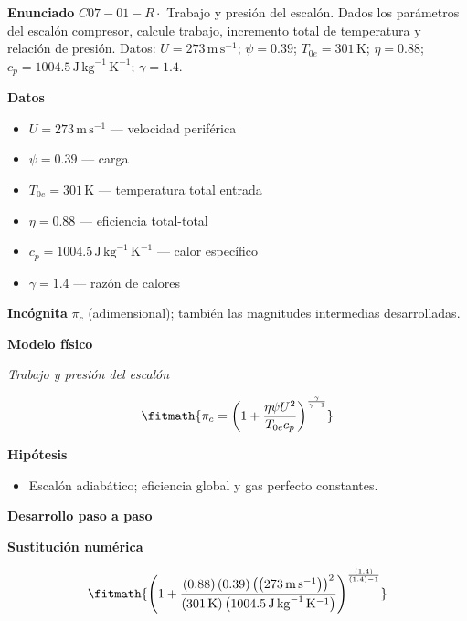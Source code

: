 \documentclass[10pt,openany]{book}
\begin{document}
\begin{tcolorbox}[title={Problema resuelto 1}, studiumworked, breakable]

\noindent\textbf{Enunciado}
\(C07-01-R \cdot\) Trabajo y presión del escalón. Dados los parámetros del escalón compresor, calcule trabajo, incremento total de temperatura y relación de presión. Datos: \(U=273\, \mathrm{m}\,\mathrm{s}^{-1}\); \(\psi=0.39\); \(T_{0e}=301\, \mathrm{K}\); \(\eta=0.88\); \(c_p=1004.5\, \mathrm{J}\,\mathrm{kg}^{-1}\,\mathrm{K}^{-1}\); \(\gamma=1.4\).

\noindent\textbf{Datos}
\begin{itemize}
\item $U = 273\,\mathrm{m}\,\mathrm{s}^{-1}$ — velocidad periférica
\item $\psi = 0.39$ — carga
\item $T_{0e} = 301\,\mathrm{K}$ — temperatura total entrada
\item $\eta = 0.88$ — eficiencia total-total
\item $c_p = 1004.5\,\mathrm{J}\,\mathrm{kg}^{-1}\,\mathrm{K}^{-1}$ — calor específico
\item $\gamma = 1.4$ — razón de calores
\end{itemize}

\noindent\textbf{Incógnita}
$\pi_c$ (adimensional); también las magnitudes intermedias desarrolladas.

\noindent\textbf{Modelo físico}

\noindent\textit{Trabajo y presión del escalón}

\[
\fitmath{\pi_c=\left(1 + \frac{\eta \psi U^{2}}{T_{0e} c_p}\right)^{\frac{\gamma}{\gamma - 1}}}
\]

\noindent\textbf{Hipótesis}
\begin{itemize}
\item Escalón adiabático; eficiencia global y gas perfecto constantes.
\end{itemize}

\noindent\textbf{Desarrollo paso a paso}



\noindent\textbf{Sustitución numérica}

\[
\fitmath{\left(1 + \frac{\left(0.88\right) \left(0.39\right) \left(\left(273\,\mathrm{m}\,\mathrm{s}^{-1}\right)\right)^{2}}{\left(301\,\mathrm{K}\right) \left(1004.5\,\mathrm{J}\,\mathrm{kg}^{-1}\,\mathrm{K}^{-1}\right)}\right)^{\frac{\left(1.4\right)}{\left(1.4\right) - 1}}}
\]


\end{tcolorbox}
\end{document}
